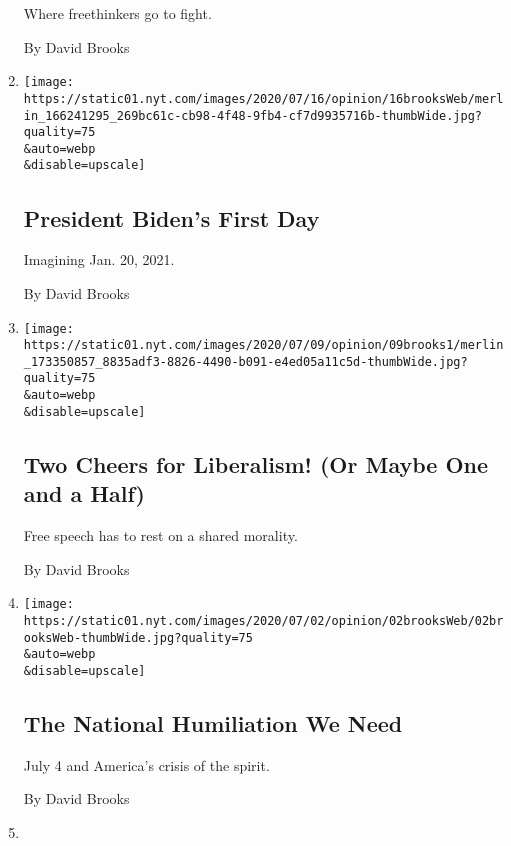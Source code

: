 \begin{enumerate}
  Where freethinkers go to fight.

  By David Brooks
\item
  \href{/2020/07/16/opinion/biden-2020.html}{}

  \texttt{[image: https://static01.nyt.com/images/2020/07/16/opinion/16brooksWeb/merlin\_166241295\_269bc61c-cb98-4f48-9fb4-cf7d9935716b-thumbWide.jpg?quality=75\\\&auto=webp\\\&disable=upscale]}

  \hypertarget{president-bidens-first-day}{%
  \subsection{President Biden's First
  Day}\label{president-bidens-first-day}}

  Imagining Jan. 20, 2021.

  By David Brooks
\item
  \href{/2020/07/09/opinion/liberalism-morality.html}{}

  \texttt{[image: https://static01.nyt.com/images/2020/07/09/opinion/09brooks1/merlin\_173350857\_8835adf3-8826-4490-b091-e4ed05a11c5d-thumbWide.jpg?quality=75\\\&auto=webp\\\&disable=upscale]}

  \hypertarget{two-cheers-for-liberalism-or-maybe-one-and-a-half}{%
  \subsection{Two Cheers for Liberalism! (Or Maybe One and a
  Half)}\label{two-cheers-for-liberalism-or-maybe-one-and-a-half}}

  Free speech has to rest on a shared morality.

  By David Brooks
\item
  \href{/2020/07/02/opinion/coronavirus-july-4.html}{}

  \texttt{[image: https://static01.nyt.com/images/2020/07/02/opinion/02brooksWeb/02brooksWeb-thumbWide.jpg?quality=75\\\&auto=webp\\\&disable=upscale]}

  \hypertarget{the-national-humiliation-we-need}{%
  \subsection{The National Humiliation We
  Need}\label{the-national-humiliation-we-need}}

  July 4 and America's crisis of the spirit.

  By David Brooks
\item
  \href{/2020/06/25/opinion/us-coronavirus-protests.html}{}


\end{enumerate}
